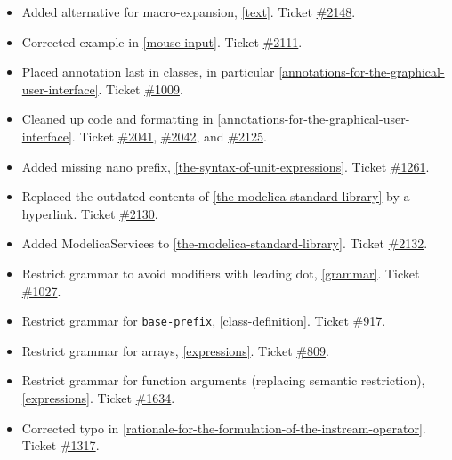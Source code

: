 \begin{itemize}
\item
  Added alternative for macro-expansion, \cref{text}. Ticket
  \href{https://github.com/modelica/ModelicaSpecification/issues/2148}{\#2148}.
\item
  Corrected example in \cref{mouse-input}. Ticket
  \href{https://github.com/modelica/ModelicaSpecification/issues/2111}{\#2111}.
\item
  Placed annotation last in classes, in particular \cref{annotations-for-the-graphical-user-interface}. Ticket
  \href{https://github.com/modelica/ModelicaSpecification/issues/1009}{\#1009}.
\item
  Cleaned up code and formatting in \cref{annotations-for-the-graphical-user-interface}. Ticket
  \href{https://github.com/modelica/ModelicaSpecification/issues/2041}{\#2041},
  \href{https://github.com/modelica/ModelicaSpecification/issues/2042}{\#2042}, and
  \href{https://github.com/modelica/ModelicaSpecification/issues/2125}{\#2125}.
\item
  Added missing nano prefix, \cref{the-syntax-of-unit-expressions}.
  Ticket \href{https://github.com/modelica/ModelicaSpecification/issues/1261}{\#1261}.
\item
  Replaced the outdated contents of \cref{the-modelica-standard-library} by a hyperlink. Ticket
  \href{https://github.com/modelica/ModelicaSpecification/issues/2130}{\#2130}.
\item
  Added ModelicaServices to \cref{the-modelica-standard-library}. Ticket
  \href{https://github.com/modelica/ModelicaSpecification/issues/2132}{\#2132}.
\item
  Restrict grammar to avoid modifiers with leading dot, \cref{grammar}.
  Ticket \href{https://github.com/modelica/ModelicaSpecification/issues/1027}{\#1027}.
\item
  Restrict grammar for \lstinline[language=grammar]!base-prefix!, \cref{class-definition}.
  Ticket \href{https://github.com/modelica/ModelicaSpecification/issues/917}{\#917}.
\item
  Restrict grammar for arrays, \cref{expressions}. Ticket
  \href{https://github.com/modelica/ModelicaSpecification/issues/809}{\#809}.
\item
  Restrict grammar for function arguments (replacing semantic
  restriction), \cref{expressions}. Ticket
  \href{https://github.com/modelica/ModelicaSpecification/issues/1634}{\#1634}.
\item
  Corrected typo in \cref{rationale-for-the-formulation-of-the-instream-operator}. Ticket
  \href{https://github.com/modelica/ModelicaSpecification/issues/1317}{\#1317}.
\end{itemize}

